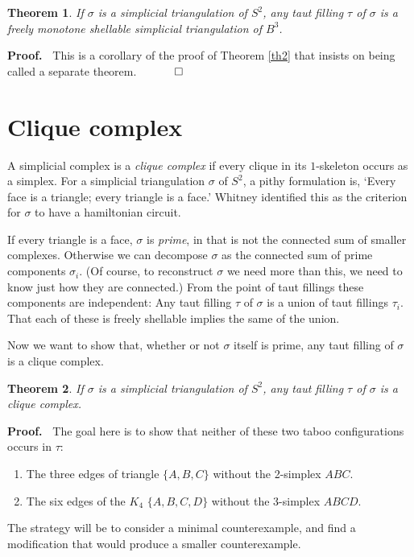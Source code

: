 \documentclass[12pt]{article}
\newtheorem{theorem}{Theorem}
\newcommand{\proofstart}{{\noindent \bf Proof.\ }}
\newcommand{\proofend}{$\quad \qed$}
\begin{document}
\begin{theorem} \label{th3}
If $\sigma$ is a simplicial triangulation of $S^2$,
any taut filling $\tau$ of $\sigma$
is a freely monotone shellable
simplicial triangulation of $B^3$.
\end{theorem}

\proofstart
This is a corollary of the proof of Theorem \ref{th2}
that insists on being called a separate theorem.
\proofend

\section{Clique complex}

A simplicial complex is a \emph{clique complex} if every clique in
its $1$-skeleton occurs as a simplex.
For a simplicial triangulation $\sigma$ of $S^2$,
a pithy formulation is,
`Every face is a triangle; every triangle is a face.'
Whitney \cite{whitney:hamiltonian} identified this as the criterion for
$\sigma$ to have a hamiltonian circuit.

If every triangle is a face,
$\sigma$ is \emph{prime},
in that is not the connected sum of smaller complexes.
Otherwise we can decompose $\sigma$ as the connected sum of
prime components $\sigma_i$.
(Of course, to reconstruct $\sigma$ we need more than this, we need to know
just how they are connected.)
From the point of taut fillings these components are independent:
Any taut filling $\tau$ of $\sigma$ is a union of taut fillings $\tau_i$.
That each of these is freely shellable implies the same of the union.

Now we want to show that, whether or not $\sigma$ itself is prime,
any taut filling of $\sigma$ is a clique complex.

\begin{theorem}
If $\sigma$ is a simplicial triangulation of $S^2$,
any taut filling $\tau$ of $\sigma$ is a clique complex.
\end{theorem}

\proofstart
The goal here is to show that neither of these
two taboo configurations occurs
in $\tau$:
\begin{enumerate}
\item
The three edges of triangle $\{A,B,C\}$ without the 2-simplex $ABC$.
\item
The six edges of the $K_4$ $\{A,B,C,D\}$ without the 3-simplex $ABCD$.
\end{enumerate}
The strategy will be to consider a minimal counterexample,
and find a modification that would produce a smaller counterexample.
\end{document}
